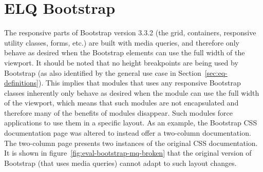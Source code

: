 \documentclass[a4paper,11pt]{kth-mag}
\begin{document}
    \section{ELQ Bootstrap}\label{sec:eval-bootstrap}
      The \gls{responsive} parts of \gls{Bootstrap} version 3.3.2 (the grid, containers, \gls{responsive} utility classes, forms, etc.) are built with \gls{media queries}, and therefore only behave as desired when the \gls{Bootstrap} \glspl{element} can use the full width of the \gls{viewport}.
      It should be noted that no height breakpoints are being used by \gls{Bootstrap} (as also identified by the general use case in Section~\ref{sec:eq-definitions}).
      This implies that modules that uses any \gls{responsive} \gls{Bootstrap} classes inherently only behave as desired when the module can use the full width of the \gls{viewport}, which means that such modules are not \gls{encapsulated} and therefore many of the benefits of modules disappear.
      Such modules force applications to use them in a specific layout.
      As an example, the \gls{Bootstrap} \gls{CSS} documentation page was altered to instead offer a two-column documentation.
      The two-column page presents two instances of the original \gls{CSS} documentation.
      It is shown in figure~\ref{fig:eval-bootstrap-mq-broken} that the original version of \gls{Bootstrap} (that uses \gls{media queries}) cannot adapt to such layout changes.
\end{document}
